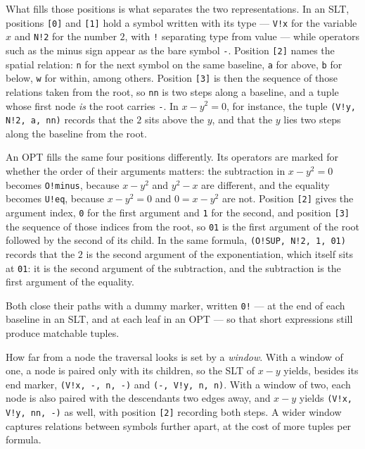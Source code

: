 \noindent
What fills those positions is what separates the two representations. In an SLT,
positions \texttt{[0]} and \texttt{[1]} hold a symbol written with its type ---
\texttt{V!x} for the variable $x$ and \texttt{N!2} for the number $2$, with
\texttt{!} separating type from value --- while operators such as the minus sign
appear as the bare symbol \texttt{-}. Position \texttt{[2]} names the spatial
relation: \texttt{n} for the next symbol on the same baseline, \texttt{a} for
above, \texttt{b} for below, \texttt{w} for within, among others. Position
\texttt{[3]} is then the sequence of those relations taken from the root, so
\texttt{nn} is two steps along a baseline, and a tuple whose first node \emph{is}
the root carries \texttt{-}. In $x - y^2 = 0$, for instance, the tuple
\texttt{(V!y, N!2, a, nn)} records that the $2$ sits above the $y$, and that the
$y$ lies two steps along the baseline from the root.

An OPT fills the same four positions differently. Its operators are marked for
whether the order of their arguments matters: the subtraction in $x - y^2 = 0$
becomes \texttt{O!minus}, because $x - y^2$ and $y^2 - x$ are different, and the
equality becomes \texttt{U!eq}, because $x - y^2 = 0$ and $0 = x - y^2$ are not.
Position \texttt{[2]} gives the argument index, \texttt{0} for the first argument
and \texttt{1} for the second, and position \texttt{[3]} the sequence of those indices
from the root, so \texttt{01} is the first argument of the root followed by the
second of its child. In the same formula, \texttt{(O!SUP, N!2, 1, 01)} records that
the $2$ is the second argument of the exponentiation, which itself sits at
\texttt{01}: it is the second argument of the subtraction, and the subtraction is
the first argument of the equality.

Both close their paths with a dummy marker, written \texttt{0!} --- at the end of
each baseline in an SLT, and at each leaf in an OPT --- so that short expressions
still produce matchable tuples.

How far from a node the traversal looks is set by a \emph{window}. With a window of
one, a node is paired only with its children, so the SLT of $x - y$ yields, besides
its end marker, \texttt{(V!x, -, n, -)} and \texttt{(-, V!y, n, n)}. With a window
of two, each node is also paired with the descendants two edges away, and $x - y$
yields \texttt{(V!x, V!y, nn, -)} as well, with position \texttt{[2]} recording
both steps. A wider window captures relations between symbols further apart, at the
cost of more tuples per formula.

